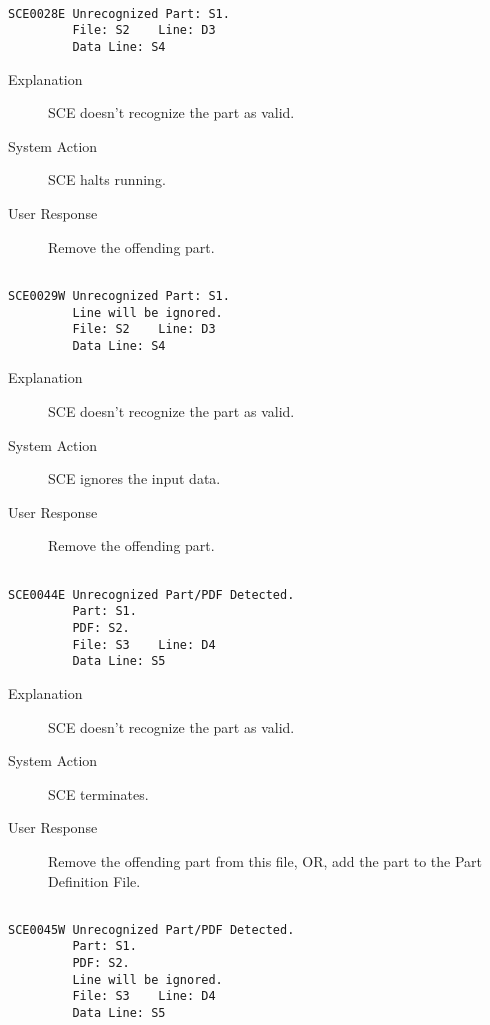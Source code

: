 \hrulefill
\begin{verbatim}

SCE0028E Unrecognized Part: S1.
         File: S2    Line: D3
         Data Line: S4
\end{verbatim}
\begin{description}
\item[Explanation]  SCE doesn't recognize the part as valid.

\item[System Action]  SCE halts running.

\item[User Response]  Remove the offending part.
\end{description}
\hrulefill
\begin{verbatim}

SCE0029W Unrecognized Part: S1.
         Line will be ignored.
         File: S2    Line: D3
         Data Line: S4
\end{verbatim}
\begin{description}
\item[Explanation]  SCE doesn't recognize the part as valid.

\item[System Action]  SCE ignores the input data.

\item[User Response]  Remove the offending part.
\end{description}
\hrulefill
\begin{verbatim}

SCE0044E Unrecognized Part/PDF Detected.
         Part: S1.
         PDF: S2.
         File: S3    Line: D4
         Data Line: S5
\end{verbatim}
\begin{description}
\item[Explanation]  SCE doesn't recognize the part as valid.

\item[System Action]  SCE terminates.

\item[User Response]  Remove the offending part from this file, OR, add the part to the Part Definition File.
\end{description}
\hrulefill
\begin{verbatim}

SCE0045W Unrecognized Part/PDF Detected.
         Part: S1.
         PDF: S2.
         Line will be ignored.
         File: S3    Line: D4
         Data Line: S5
\end{verbatim}
